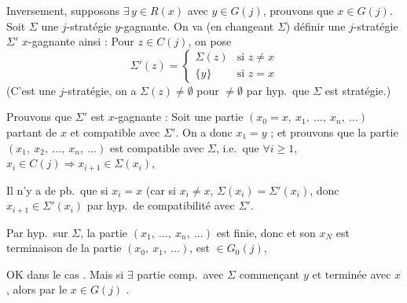 \documentclass[11pt,a4paper]{article}
\begin{document}
Inversement, supposons $\exists\,y\in R(x)$ avec $y\in G(j)$, prouvons que $x\in G(j)$. Soit $\Sigma$ une $j$-stratégie $y$-gagnante. On va (en changeant $\Sigma$) définir une $j$-stratégie $\Sigma'$ $x$-gagnante ainsi : Pour $z\in C(j)$, on pose
\[
  \Sigma'(z)=\begin{cases}
    \Sigma(z) & \text{si } z\neq x\\
    \{y\} & \text{si } z=x
  \end{cases}
\]
(C'est une $j$-stratégie, on a  $\Sigma(z)\neq\emptyset$ pour   $\neq\emptyset$ par hyp.\ que $\Sigma$ est stratégie.)

Prouvons que $\Sigma'$ est $x$-gagnante : Soit une partie $(x_0=x,\ x_1,\ \ldots,\ x_n,\ \ldots)$ partant de $x$ et compatible avec $\Sigma'$. On a donc $x_1=y$ ; et prouvons que la partie $(x_1,\ x_2,\ \ldots,\ x_n,\ \ldots)$ est compatible avec $\Sigma$, i.e.\ que \struck{\ill{}} $\forall i\geqslant 1$, $x_i\in C(j)\Longrightarrow x_{i+1}\in\Sigma(x_i)$,

Il n'y a de pb.\ que si \struck{\ill{}} $x_i=x$ (car si $x_i\neq x$, $\Sigma(x_i)=\Sigma'(x_i)$, donc $x_{i+1}\in\Sigma'(x_i)$ par hyp.\ de compatibilité avec $\Sigma'$. 



\struck{\ill{}} Par hyp.\ sur $\Sigma$, la partie $(x_1,\ \ldots,\ x_n,\ \ldots)$ est finie, donc et son \struck{\ill{}}  $x_N$  est \ill{} terminaison de la partie $(x_0,\ x_1,\ \ldots)$, est $\in G_0(j)$,

\struck{\ill{}} OK dans le cas \ill{}.
Mais si $\exists$ partie comp.\ avec $\Sigma$ commençant  $y$ et terminée avec $x$, alors par le  \ill{} $x\in G(j)$ .
\end{document}
